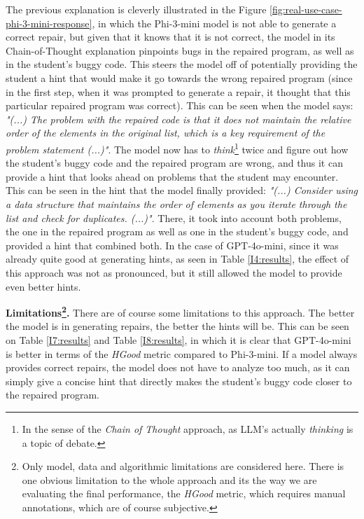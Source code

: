 \documentclass{article}
\begin{document}
The previous explanation is cleverly illustrated in the Figure \ref{fig:real-use-case-phi-3-mini-response}, in which the Phi-3-mini model is not able to generate a correct repair, but given that it knows that it is not correct, the model in its Chain-of-Thought explanation pinpoints bugs in the repaired program, as well as in the student's buggy code. This steers the model off of potentially providing the student a hint that would make it go towards the wrong repaired program (since in the first step, when it was prompted to generate a repair, it thought that this particular repaired program was correct). This can be seen when the model says: \textit{"(...) The problem with the repaired code is that it does not maintain the relative order of the elements in the original list, which is a key requirement of the problem statement (...)"}. The model now has to \textit{think}\footnote{In the sense of the \textit{Chain of Thought} approach, as LLM's actually \textit{thinking} is a topic of debate.} twice and figure out how the student's buggy code and the repaired program are wrong, and thus it can provide a hint that looks ahead on problems that the student may encounter. This can be seen in the hint that the model finally provided: \textit{"(...) Consider using a data structure that maintains the order of elements as you iterate through the list and check for duplicates. (...)"}. There, it took into account both problems, the one in the repaired program as well as one in the student's buggy code, and provided a hint that combined both. In the case of GPT-4o-mini, since it was already quite good at generating hints, as seen in Table \ref{I4:results}, the effect of this approach was not as pronounced, but it still allowed the model to provide even better hints.

\textbf{Limitations\footnote{Only model, data and algorithmic limitations are considered here. There is one obvious limitation to the whole approach and its the way we are evaluating the final performance, the \textit{HGood} metric, which requires manual annotations, which are of course subjective.}.} There are of course some limitations to this approach. The better the model is in generating repairs, the better the hints will be. This can be seen on Table \ref{I7:results} and Table \ref{I8:results}, in which it is clear that GPT-4o-mini is better in terms of the \textit{HGood} metric \cite{HintsInBrowser2024} compared to Phi-3-mini. If a model always provides correct repairs, the model does not have to analyze too much, as it can simply give a concise hint that directly makes the student's buggy code closer to the repaired program.
\end{document}
